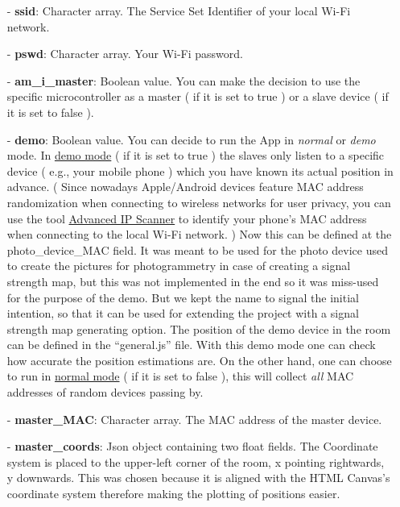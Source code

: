 \documentclass[11pt,a4paper]{article}
\numberwithin{equation}{section}   %
\numberwithin{figure}{section}     %
\numberwithin{table}{section}      %
\begin{document}
\begin{itemize}
\setlength{\itemsep}{0pt}
\setlength{\parsep}{0pt}
\setlength{\parskip}{0pt}

\item[-] \textbf{ssid}: Character array. The Service Set Identifier of your local Wi-Fi network.\\

\item[-] \textbf{pswd}: Character array. Your Wi-Fi password.\\

\item[-] \textbf{am\_i\_master}:  Boolean value. You can make the decision to use the specific microcontroller as a master ( if it is set to true ) or a slave device ( if it is set to false ).

\newpage

\item[-] \textbf{demo}: Boolean value. You can decide to run the App in \emph{normal} or \emph{demo} mode. In \underline{demo mode} ( if it is set to true ) the slaves only listen to a specific device ( e.g., your mobile phone ) which you have known its actual position in advance. ( Since nowadays Apple/Android devices feature MAC address randomization when connecting to wireless networks for user privacy, you can use the tool \href{https://www.advanced-ip-scanner.com/}{Advanced IP Scanner} to identify your phone's MAC address when connecting to the local Wi-Fi network. ) Now this can be defined at the photo\_device\_MAC field. It was meant to be used for the photo device used to create the pictures for photogrammetry in case of creating a signal strength map, but this was not implemented in the end so it was miss-used for the purpose of the demo. But we kept the name to signal the initial intention, so that it can be used for extending the project with a signal strength map generating option. The position of the demo device in the room can be defined in the ``general.js'' file. With this demo mode one can check how accurate the position estimations are. On the other hand, one can choose to run in \underline{normal mode} ( if it is set to false ), this will collect \emph{all} MAC addresses of random devices passing by.\\

\item[-] \textbf{master\_MAC}: Character array. The MAC address of the master device.\\

\item[-] \textbf{master\_coords}: Json object containing two float fields. The Coordinate system is placed to the upper-left corner of the room, x pointing rightwards, y downwards. This was chosen because it is aligned with the HTML Canvas's coordinate system therefore making the plotting of positions easier.\\


\end{itemize}
\end{document}
